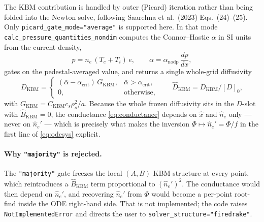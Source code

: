 \documentclass[11pt]{article}
\newcommand{\hn}{\hat{n}}
\newcommand{\hx}{\hat{x}}
\newcommand{\hD}{\hat{D}}
\newcommand{\hf}{\hat{f}}
\newcommand{\code}[1]{\texttt{#1}}
\begin{document}
The KBM contribution is handled by outer (Picard) iteration rather than
being folded into the Newton solve, following Saarelma et
al.~(2023) Eqs.~(24)--(25).  Only \code{picard\_gate\_mode="average"} is
supported here.  In that mode
\code{calc\_pressure\_quantities\_nondim} computes the Connor--Hastie
$\alpha$ in SI units from the current density,
\begin{equation}
  p = n_e\,(T_e + T_i)\,e, \qquad
  \alpha = \alpha_{\mathrm{nodp}}\,\frac{dp}{dx},
\end{equation}
gates on the pedestal-averaged value, and returns a single whole-grid
diffusivity
\begin{equation}
  D_{\mathrm{KBM}} =
  \begin{cases}
    (\bar{\alpha} - \alpha_{\mathrm{crit}})\,G_{\mathrm{KBM}},
      & \bar{\alpha} > \alpha_{\mathrm{crit}},\\
    0, & \text{otherwise},
  \end{cases}
  \qquad
  \hD_{\mathrm{KBM}} = D_{\mathrm{KBM}}/[D]_0 ,
\end{equation}
with $G_{\mathrm{KBM}} = C_{\mathrm{KBM}} c_s \rho_s^2 / a$.  Because the
whole frozen diffusivity sits in the $D$-slot with
$\hat{B}_{\mathrm{KBM}} = 0$, the conductance
\eqref{eq:conductance} depends on $\hx$ and $\hn_e$ only --- never on
$\hn_e'$ --- which is precisely what makes the inversion
$\Phi \mapsto \hn_e' = \Phi/\hf$ in the first line of \eqref{eq:odesys} explicit.

\paragraph{Why \code{"majority"} is rejected.}
The \code{"majority"} gate freezes the local $(A,B)$ KBM structure at
every point, which reintroduces a $\hat{B}_{\mathrm{KBM}}$ term
proportional to $(\hn_e')^2$.  The conductance would then depend on
$\hn_e'$, and recovering $\hn_e'$ from $\Phi$ would become a per-point
root-find inside the ODE right-hand side.  That is not implemented; the
code raises \code{NotImplementedError} and directs the user to
\code{solver\_structure="firedrake"}.
\end{document}

